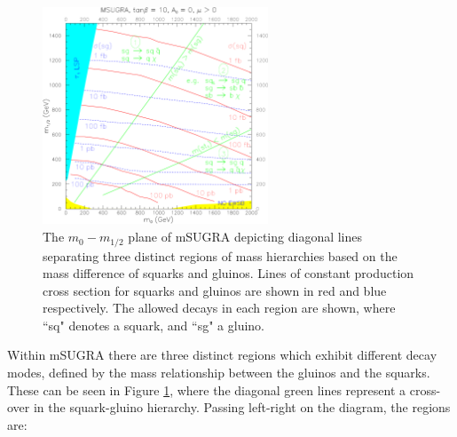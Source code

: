 \begin{figure}
\centering
\includegraphics[width=0.6\textwidth]{Figures/Theory/mSUGRA_TDR_1}
\caption[The $m_{0}-m_{1/2}$ plane of mSUGRA depicting diagonal lines separating three distinct regions of mass hierarchies based on the mass difference of squarks and gluinos. ]{\label{fig:msugratdr}The $m_{0}-m_{1/2}$ plane of mSUGRA depicting diagonal lines separating three distinct regions of mass hierarchies based on the mass difference of squarks and gluinos. Lines of constant production cross section for squarks and gluinos are shown in red and blue respectively. The allowed decays in each region are shown, where ``sq" denotes a squark, and ``sg" a gluino.\cite{CMSTDRII}}

\end{figure}

Within mSUGRA there are three distinct regions which exhibit different decay modes, defined by the mass relationship between the gluinos and the squarks. These can be seen in Figure \ref{fig:msugratdr}, where the diagonal green lines represent a cross-over in the squark-gluino hierarchy. Passing left-right on the diagram, the regions are:

